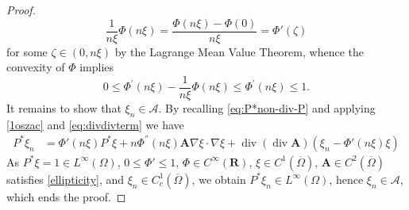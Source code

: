 \documentclass[10pt,a4paper]{amsart}
\newcommand{\A}{\mathbf{A}}
\newcommand*\Div{\operatorname{div}}
\begin{document}
\begin{proof}
\begin{equation*}
        \frac{1}{n\xi}\Phi(n\xi ) = \frac{\Phi(n\xi ) - \Phi(0)}{n\xi} = \Phi'(\zeta)
    \end{equation*}
    for some $\zeta \in (0, n\xi)$ by the Lagrange Mean Value Theorem, whence the convexity of $\Phi$ implies 
    \begin{equation*}
        0 \leq \Phi^{'}(n\xi ) - \frac{1}{n \xi}\Phi(n\xi ) \leq \Phi^{'}(n\xi ) \leq 1.
    \end{equation*}
    It remains to show that $\xi_n\in \mathcal{A}$. By recalling \eqref{eq:P*non-div-P} and applying \eqref{1oszac} and \eqref{eq:divdivterm} we have
    \begin{equation*}
    \begin{split}
         P^\ast \xi_n &= 
         \Phi'(n\xi) P^\ast \xi + n\Phi^{''}(n\xi ) \A \nabla\xi  \cdot \nabla\xi + \Div (\Div \A) (\xi_n - \Phi'(n\xi) \xi)
    \end{split}
    \end{equation*}
    As $P^\ast \xi = 1 \in L^{\infty}(\Omega)$, $0\leq \Phi' \leq 1$, $\Phi \in C^{\infty}(\mathbf{R})$, $\xi \in C^1(\overline{\Omega})$, $\A \in C^2(\overline{\Omega})$ satisfies \eqref{ellipticity}, and $\xi_n \in C^1_c(\overline{\Omega})$, we obtain $P^\ast \xi_n \in L^{\infty}(\Omega)$, hence $\xi_n \in \mathcal{A}$, which ends the proof.
\end{proof}
\end{document}
